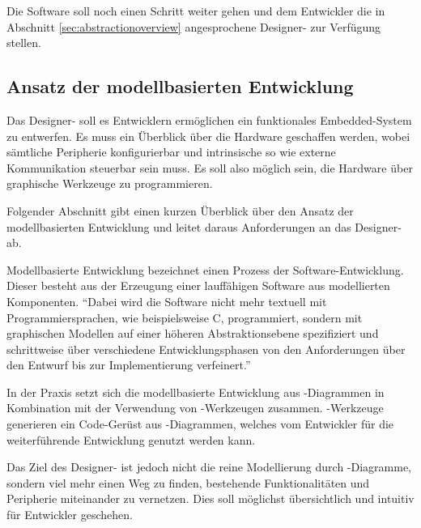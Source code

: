     Die Software soll noch einen Schritt weiter gehen und dem Entwickler die in Abschnitt \ref{sec:abstractionoverview}
    angesprochene Designer- zur Verfügung stellen.

    \subsection{Ansatz der modellbasierten Entwicklung}
    \label{sec:modelbaseddev}
    Das Designer- soll es Entwicklern ermöglichen ein funktionales Embedded-System zu entwerfen.
    Es muss ein Überblick über die Hardware geschaffen werden, wobei sämtliche Peripherie konfigurierbar und
    intrinsische so wie externe Kommunikation steuerbar sein muss. Es soll also möglich sein, die Hardware
    über graphische Werkzeuge zu programmieren.

    Folgender Abschnitt gibt einen kurzen Überblick über den Ansatz der modellbasierten Entwicklung und leitet daraus
    Anforderungen an das Designer- ab.

    Modellbasierte Entwicklung bezeichnet einen Prozess der Software-Entwicklung. Dieser besteht aus der Erzeugung einer
    lauffähigen Software aus modellierten Komponenten.
    ``Dabei wird die Software nicht mehr textuell mit Programmiersprachen, wie beispielsweise C, programmiert, sondern
    mit graphischen Modellen auf einer höheren Abstraktionsebene spezifiziert und schrittweise über verschiedene
    Entwicklungsphasen von den Anforderungen über den Entwurf bis zur Implementierung verfeinert.''\citep[vgl.~S.~165]{Berns2010}

    In der Praxis setzt sich die modellbasierte Entwicklung aus -Diagrammen in
    Kombination mit der Verwendung von -Werkzeugen zusammen.
    -Werkzeuge generieren ein Code-Gerüst aus -Diagrammen, welches vom Entwickler für die weiterführende
    Entwicklung genutzt werden kann.

    Das Ziel des Designer- ist jedoch nicht die reine Modellierung durch -Diagramme, sondern viel mehr einen Weg
    zu finden, bestehende Funktionalitäten und Peripherie miteinander zu vernetzen. Dies soll möglichst übersichtlich
    und intuitiv für Entwickler geschehen.

